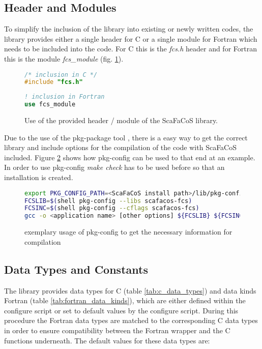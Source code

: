 \subsection{Header and Modules}
To simplify the inclusion of the library into existing or newly written codes, the library provides either a single header for C or a
single module for Fortran which needs to be included into the code. For C this is the \textit{fcs.h} header and for Fortran this is the
module \textit{fcs\_module} (fig. \ref {fig:header_module}). 

\begin{figure}[htb]
\begin{lstlisting}[language=C, frame=trBL]
/* inclusion in C */
#include "fcs.h"
\end{lstlisting}
\begin{lstlisting}[language=Fortran, frame=trBL]
! inclusion in Fortran
use fcs_module
\end{lstlisting}
\caption{Use of the provided header / module of the ScaFaCoS library.}
\label{fig:header_module}
\end{figure}

Due to the use of the pkg-package tool \cite{pkg-package}, there is a easy way to get the correct library and include options for the compilation
of the code with ScaFaCoS included. Figure \ref{fig:pkg-usage} shows how pkg-config can be used to that end at an example. In order to use pkg-config
\textit{make check} has to be used before so that an installation is created.

\begin{figure}[htb]
\begin{lstlisting}[language=bash, breaklines, prebreak={\raisebox{0ex}[0ex][0ex]{\ensuremath{\hookleftarrow}}} ]
export PKG_CONFIG_PATH=<ScaFaCoS install path>/lib/pkg-config:${PKG_CONFIG_PATH}
FCSLIB=$(shell pkg-config --libs scafacos-fcs)
FCSINC=$(shell pkg-config --cflags scafacos-fcs)
gcc -o <application name> [other options] ${FCSLIB} ${FCSINC} <source(s)>
\end{lstlisting}
\caption{exemplary usage of pkg-config to get the necessary information for compilation}
\label{fig:pkg-usage}
\end{figure}


\subsection{Data Types and Constants}
The library provides data types for C (table \ref{tab:c_data_types}) and data kinds Fortran (table \ref{tab:fortran_data_kinds}), which are either defined within the configure script or set to default values by the
configure script. During this procedure the Fortran data types are matched to the corresponding C data types in order to ensure
compatibility between the Fortran wrapper and the C functions underneath. The default values for these data types are:



